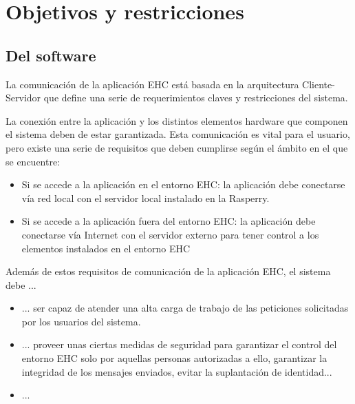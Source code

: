 \chapter{Objetivos y restricciones}

\section{Del software}

La comunicaci\'on de la aplicaci\'on EHC est\'a basada en la arquitectura Cliente-Servidor que define una serie de requerimientos claves y restricciones del sistema. 

La conexi\'on entre la aplicaci\'on y los distintos elementos hardware que componen el sistema deben de estar garantizada. Esta comunicaci\'on es vital para el usuario, pero existe una serie de requisitos que deben cumplirse seg\'un el \'ambito en el que se encuentre:
\begin{itemize}
\item Si se accede a la aplicaci\'on en el entorno EHC: la aplicaci\'on debe conectarse v\'ia red local con el servidor local instalado en la Rasperry.
\item Si se accede a la aplicaci\'on fuera del entorno EHC: la aplicaci\'on debe conectarse v\'ia Internet con el servidor externo para tener control a los elementos instalados en el entorno EHC
\end{itemize}

Adem\'as de estos requisitos de comunicaci\'on de la aplicaci\'on EHC, el sistema debe ...
\begin{itemize}
\item ... ser capaz de atender una alta carga de trabajo de las peticiones solicitadas por los usuarios del sistema.
\item ... proveer unas ciertas medidas de seguridad para garantizar el control del entorno EHC solo por aquellas personas autorizadas a ello, garantizar la integridad de los mensajes enviados, evitar la suplantaci\'on de identidad...
\item ...
\end{itemize}


